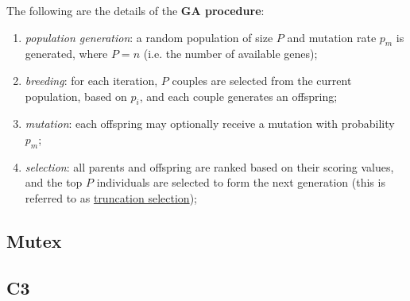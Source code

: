 \begin{definition}[GA procedure]
    The following are the details of the \textbf{GA procedure}:

    \begin{enumerate}
        \item \textit{population generation}: a random population of size $P$ and mutation rate $p_m$ is generated, where $P = n$ (i.e. the number of available genes);
        \item \textit{breeding}: for each iteration, $P$ couples are selected from the current population, based on $p_i$, and each couple generates an offspring;
        \item \textit{mutation}: each offspring may optionally receive a mutation with probability $p_m$;
        \item \textit{selection}: all parents and offspring are ranked based on their scoring values, and the top $P$ individuals are selected to form the next generation (this is referred to as \href{https://en.wikipedia.org/wiki/Truncation_selection}{truncation selection});
    \end{enumerate}
\end{definition}

\subsection{Mutex}

\subsection{C3}

\cleardoublepage
